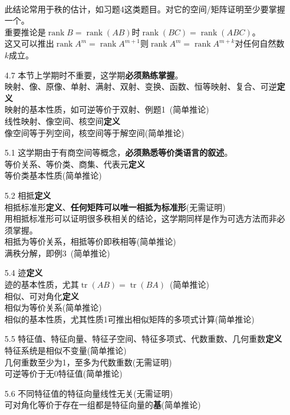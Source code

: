 \documentclass[a4paper,UTF8,fontset=windows,AutoFakeBold]{ctexart}
\DeclareMathOperator{\rank}{rank}
\DeclareMathOperator{\tr}{tr}
\newcommand*{\note}{\noindent *}
\begin{document}
\begin{enumerate}
    \\\note 此结论常用于秩的估计，如习题4这类题目。对它的空间/矩阵证明至少要掌握一个。
    \\\note 重要推论是$\rank B=\rank(AB)$时$\rank(BC)=\rank(ABC)$。
    \\\note 这又可以推出$\rank A^m=\rank A^{m+1}$则$\rank A^m=\rank A^{m+k}$对任何自然数$k$成立。
    \item[4.7] \note 本节上学期时不重要，这学期\textbf{必须熟练掌握}。
    \\映射、像、原像、单射、满射、双射、变换、函数、恒等映射、复合、可逆\textbf{定义}
    \\映射的基本性质，如可逆等价于双射、例题1\ (简单推论)
    \\线性映射、像空间、核空间\textbf{定义}
    \\像空间等于列空间，核空间等于解空间(简单推论)
    \item[5.1] \note 这学期由于有商空间等概念，\textbf{必须熟悉等价类语言的叙述}。
    \\等价关系、等价类、商集、代表元\textbf{定义}
    \\等价类基本性质(简单推论)
    \item[5.2] 相抵\textbf{定义}
    \\相抵标准形\textbf{定义}、\textbf{任何矩阵可以唯一相抵为标准形}(无需证明)
    \\\note 用相抵标准形可以证明很多秩相关的结论，这学期同样是作为可选方法而非必须掌握。
    \\相抵为等价关系，相抵等价即秩相等(简单推论)
    \\满秩分解，即例3\ (简单推论)
    \item[5.4] 迹\textbf{定义}
    \\迹的基本性质，尤其$\tr(AB)=\tr(BA)$\ (简单推论)
    \\相似、可对角化\textbf{定义}
    \\相似为等价关系(简单推论)
    \\相似的基本性质，尤其性质1可推出相似矩阵的多项式计算(简单推论)
    \item[5.5] 特征值、特征向量、特征子空间、特征多项式、代数重数、几何重数\textbf{定义}
    \\特征系统是相似不变量(简单推论)
    \\几何重数至少为1，至多为代数重数(无需证明)
    \\可逆等价于无0特征值(简单推论)
    \item[5.6] 不同特征值的特征向量线性无关(无需证明)
    \\可对角化等价于存在一组都是特征向量的\textbf{基}(简单推论)

\end{enumerate}
\end{document}
